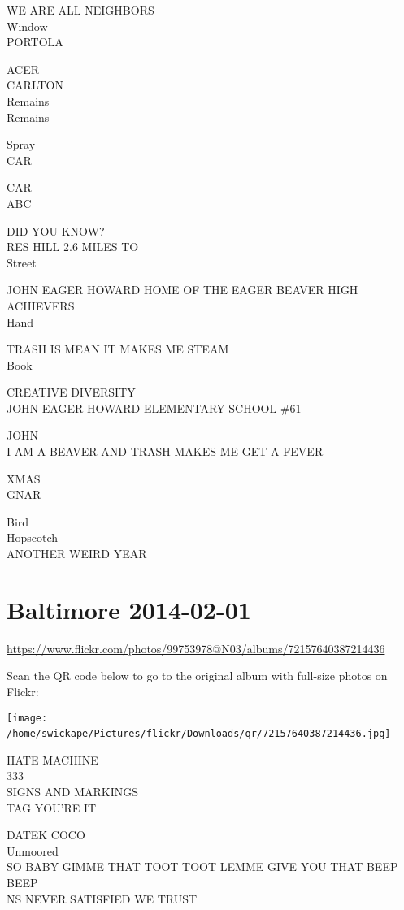 \documentclass[10pt,letterpaper]{article}
\begin{document}
WE ARE ALL NEIGHBORS\\
Window\\
PORTOLA

ACER\\
CARLTON\\
Remains\\
Remains

Spray\\
CAR

CAR\\
ABC

DID YOU KNOW?\\
RES HILL 2.6 MILES TO\\
Street

JOHN EAGER HOWARD HOME OF THE EAGER BEAVER HIGH ACHIEVERS\\
Hand

TRASH IS MEAN IT MAKES ME STEAM\\
Book

CREATIVE DIVERSITY\\
JOHN EAGER HOWARD ELEMENTARY SCHOOL \#61

JOHN\\
I AM A BEAVER AND TRASH MAKES ME GET A FEVER

XMAS\\
GNAR

Bird\\
Hopscotch\\
ANOTHER WEIRD YEAR
\

\section*{Baltimore 2014-02-01}

\url{https://www.flickr.com/photos/99753978@N03/albums/72157640387214436}

Scan the QR code below to go to the original album with full-size photos on Flickr:

\texttt{[image: /home/swickape/Pictures/flickr/Downloads/qr/72157640387214436.jpg]}
\

HATE MACHINE\\
333\\
SIGNS AND MARKINGS\\
TAG YOU'RE IT

DATEK COCO\\
Unmoored\\
SO BABY GIMME THAT TOOT TOOT LEMME GIVE YOU THAT BEEP BEEP\\
NS NEVER SATISFIED WE TRUST
\end{document}
